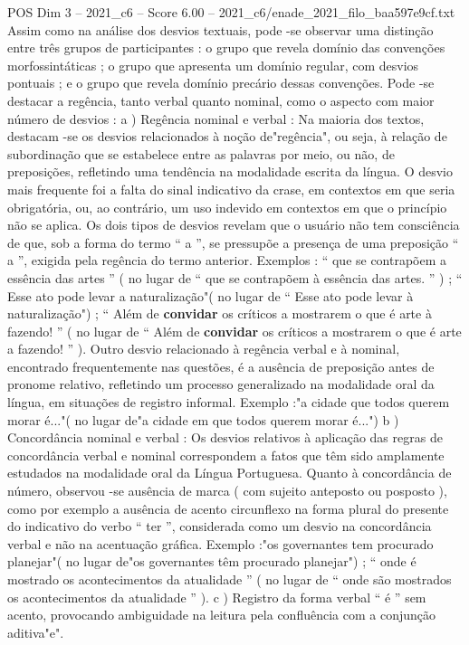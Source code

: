 \begin{textsample}{POS Dim 3 – 2021\_c6 – Score 6.00 – 2021\_c6/enade\_2021\_filo\_baa597e9cf.txt}
Assim como na análise dos desvios textuais, pode -se observar uma distinção entre três grupos de participantes : o grupo que revela domínio das convenções morfossintáticas ; o grupo que apresenta um domínio regular, com desvios pontuais ; e o grupo que revela domínio precário dessas convenções.
Pode -se destacar a regência, tanto verbal quanto nominal, como o aspecto com maior número de desvios : a ) Regência nominal e verbal : Na maioria dos textos, destacam -se os desvios relacionados à noção de"regência", ou seja, à relação de subordinação que se estabelece entre as palavras por meio, ou não, de preposições, refletindo uma tendência na modalidade escrita da língua.
O desvio mais frequente foi a falta do sinal indicativo da crase, em contextos em que seria obrigatória, ou, ao contrário, um uso indevido em contextos em que o princípio não se aplica.
Os dois tipos de desvios revelam que o usuário não tem consciência de que, sob a forma do termo “ a ”, se pressupõe a presença de uma preposição “ a ”, exigida pela regência do termo anterior.
Exemplos : “ que se contrapõem a essência das artes ” ( no lugar de “ que se contrapõem à essência das artes. ” ) ; “ Esse ato pode levar a naturalização"( no lugar de “ Esse ato pode levar à naturalização") ; “ Além de \textbf{convidar} os críticos a mostrarem o que é arte à fazendo! ” ( no lugar de “ Além de \textbf{convidar} os críticos a mostrarem o que é arte a fazendo! ” ).
Outro desvio relacionado à regência verbal e à nominal, encontrado frequentemente nas questões, é a ausência de preposição antes de pronome relativo, refletindo um processo generalizado na modalidade oral da língua, em situações de registro informal.
Exemplo :"a cidade que todos querem morar é..."( no lugar de"a cidade em que todos querem morar é...") b ) Concordância nominal e verbal : Os desvios relativos à aplicação das regras de concordância verbal e nominal correspondem a fatos que têm sido amplamente estudados na modalidade oral da Língua Portuguesa.
Quanto à concordância de número, observou -se ausência de marca ( com sujeito anteposto ou posposto ), como por exemplo a ausência de acento circunflexo na forma plural do presente do indicativo do verbo “ ter ”, considerada como um desvio na concordância verbal e não na acentuação gráfica.
Exemplo :"os governantes tem procurado planejar"( no lugar de"os governantes têm procurado planejar") ; “ onde é mostrado os acontecimentos da atualidade ” ( no lugar de “ onde são mostrados os acontecimentos da atualidade ” ). c ) Registro da forma verbal “ é ” sem acento, provocando ambiguidade na leitura pela confluência com a conjunção aditiva"e".

\end{textsample}

